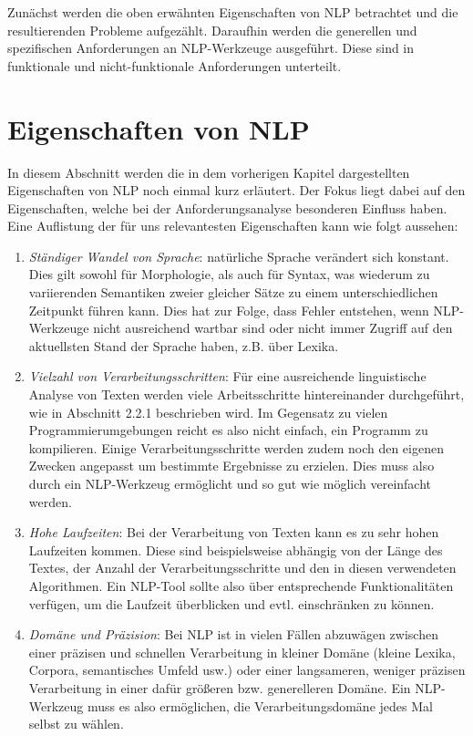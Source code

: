 \documentclass[12pt]{report}
\begin{document}
Zunächst werden die oben erwähnten Eigenschaften von NLP betrachtet und die resultierenden Probleme aufgezählt. Daraufhin werden die generellen und spezifischen Anforderungen an NLP-Werkzeuge ausgeführt. Diese sind in funktionale und nicht-funktionale Anforderungen unterteilt.

\section{Eigenschaften von NLP}
In diesem Abschnitt werden die in dem vorherigen Kapitel dargestellten Eigenschaften von NLP noch einmal kurz erläutert. Der Fokus liegt dabei auf den Eigenschaften, welche bei der Anforderungsanalyse besonderen Einfluss haben. Eine Auflistung der für uns relevantesten Eigenschaften kann wie folgt aussehen:

\begin{enumerate}
\item \textit{Ständiger Wandel von Sprache}: natürliche Sprache verändert sich konstant. Dies gilt sowohl für Morphologie, als auch für Syntax, was wiederum zu variierenden Semantiken zweier gleicher Sätze zu einem unterschiedlichen Zeitpunkt führen kann. Dies hat zur Folge, dass Fehler entstehen, wenn NLP-Werkzeuge nicht ausreichend wartbar sind oder nicht immer Zugriff auf den aktuellsten Stand der Sprache haben, z.B. über Lexika.
\item \textit{Vielzahl von Verarbeitungsschritten}: Für eine ausreichende linguistische Analyse von Texten werden viele Arbeitsschritte hintereinander durchgeführt, wie in Abschnitt 2.2.1 beschrieben wird. Im Gegensatz zu vielen Programmierumgebungen reicht es also nicht einfach, ein Programm zu kompilieren. Einige Verarbeitungsschritte werden zudem noch den eigenen Zwecken angepasst um bestimmte Ergebnisse zu erzielen. Dies muss also durch ein NLP-Werkzeug ermöglicht und so gut wie möglich vereinfacht werden.
\item \textit{Hohe Laufzeiten}: Bei der Verarbeitung von Texten kann es zu sehr hohen Laufzeiten kommen. Diese sind beispielsweise abhängig von der Länge des Textes, der Anzahl der Verarbeitungsschritte und den in diesen verwendeten Algorithmen. Ein NLP-Tool sollte also über entsprechende Funktionalitäten verfügen, um die Laufzeit überblicken und evtl. einschränken zu können. 
\item \textit{Domäne und Präzision}: Bei NLP ist in vielen Fällen abzuwägen zwischen einer präzisen und schnellen Verarbeitung in kleiner Domäne (kleine Lexika, Corpora, semantisches Umfeld usw.) oder einer langsameren, weniger präzisen Verarbeitung in einer dafür größeren bzw. generelleren Domäne. Ein NLP-Werkzeug muss es also ermöglichen, die Verarbeitungsdomäne jedes Mal selbst zu wählen.
\end{enumerate}
\end{document}
